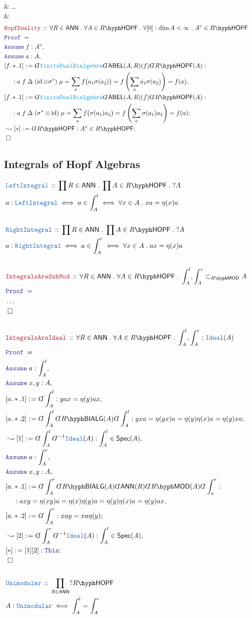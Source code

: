 \documentclass[12pt]{scrartcl}%
\newcommand{\TYPE}[1]{\textcolor{NavyBlue}{\mathtt{#1}}}%
\newcommand{\FUNC}[1]{\textcolor{Cerulean}{\mathtt{#1}}}%
\newcommand{\LOGIC}[1]{\textcolor{Blue}{\mathtt{#1}}}%
\newcommand{\THM}[1]{\textcolor{Maroon}{\mathtt{#1}}}%
\renewcommand{\.}{\; . \;} %
\newcommand{\de}{: \kern 0.1pc =} %
\newcommand{\Theorem}[2]{& \THM{#1} \, :: \, #2 \\ & \Proof = \\ } %
\newcommand{\DeclareType}[2]{& \TYPE{#1} \, :: \, #2 \\}%
\newcommand{\DefineType}[3]{& #1 : \TYPE{#2} \iff #3 \\}%
\newcommand{\DefineNamedType}[4]{& #1 : \TYPE{#2} \iff #3 \iff #4 \\}%
\newcommand{\NewLine}{\\ & \kern 1pc}%
\newcommand{\Page}[1]{ \begin{align*} #1 \end{align*}  }%
\newcommand{ \bd }{ \ByDef }%
\newcommand{\NoProof}{ & \ldots \\ \EndProof}%
\DeclareMathOperator*{\id}{id}%
\newcommand{\Say}[3]{& #1 \de #2 : #3, \\} %
\newcommand{\Conclude}[3]{& #1 \de #2 : #3; \\}%
\newcommand{\Derive}[3]{& \leadsto #1 \de #2 : #3, \\} %
\newcommand{\DeriveConclude}[3]{& \leadsto #1 \de #2 : #3 ; \\} %
\newcommand{\Assume}[2]{& \LOGIC{Assume} \; #1 : #2, \\} %
\newcommand{\QED}{\; \square} %
\newcommand{\EndProof}{& \QED \\} %
\newcommand{\ByDef}{\rotatebox[origin=c]{-180}{$D$}}%
\newcommand{\Proof}{\LOGIC{Proof} \; } %
\newcommand{\ABEL}{\mathsf{ABEL}} %
\newcommand{\submod}[1]{\subset_{\LMOD{#1}}}%
\newcommand{\LMOD}[1]{#1\hyph\mathsf{MOD}} %
\newcommand{\Ideal}{\TYPE{Ideal}}
\newcommand{\ANN}{\mathsf{ANN}} %
\newcommand{\BIALG}[1]{#1\hyph\mathsf{BIALG}}%
\newcommand{\HOPF}[1]{#1\hyph\mathsf{HOPF}}%
\begin{document}
{{	}
	\NoProof
}\Page{
	\Theorem{HopfDuality}{  
		\forall R \in \ANN \.
		\forall A \in \HOPF{R} \.
		\forall [0] : \dim A < \infty \.
		A^\circ \in \HOPF{R}
	}
	\Assume{f}{A^\circ}
	\Assume{a}{A}
	\Say{[f.*.1]}
	{
		\bd \FUNC{finiteDualBialgebra}
		\bd \ABEL(A,R)(f)
		\bd \HOPF{R}(A)
	}
	{
		\NewLine :
		a \; f \; \Delta \; (\id \otimes \sigma^*) \; \mu  =
		\sum_a f\big( a_1 \sigma(a_2)  \big)   =
		f \left( \sum_a a_1 \sigma(a_2) \right)  =
		f(a)
	}
	\Conclude{[f.*.1]}
	{
		\bd \FUNC{finiteDualBialgebra}
		\bd \ABEL(A,R)(f)
		\bd \HOPF{R}(A)
	}
	{
		\NewLine :
		a  \;  f \; \Delta \; (\sigma^* \otimes \id) \; \mu  =
		\sum_a f\big( \sigma(a_1) a_2  \big)   =
		f \left( \sum_a \sigma(a_1) a_2 \right)  =
		f(a)
	}
	\DeriveConclude{[*]}{\bd \HOPF{R}}{A^\circ \in \HOPF{R}}
	\EndProof
}
\newpage
\subsection{Integrals of Hopf Algebras}
\Page{
	\DeclareType{LeftIntegral}{\prod R \in \ANN \. \prod A \in \HOPF{R} \. ?A}
	\DefineNamedType{a}{LeftIntegral}{a \in \int_A^l }{\forall x \in A \. xa = \eta(x)a}
	\\
	\DeclareType{RightIntegral}{\prod R \in \ANN \. \prod A \in \HOPF{R} \. ?A}
	\DefineNamedType{a}{RightIntegral}{a \in \int_A^r }{\forall x \in A \. ax = \eta(x)a}
	\\
	\Theorem{IntegralsAreSubMod}{
		\forall R \in \ANN \. 
		\forall A \in \HOPF{R} \. 
		\int^l_A, \int^r_A \submod{R} A
	}
	\NoProof
	\\
	\Theorem{IntegralsAreIdeal}
	{
		\forall R \in \ANN \.
		\forall A \in \HOPF{R} \.
		\int^l_A,\int^r_A : \Ideal(A)
	}
	\Assume{a}{\int^l_A}
	\Assume{x,y}{A}
	\Say{[a.*.1]}{\bd \int^l_A}
	{ 
		yax = \eta(y)ax
	}
	\Conclude{[a.*.2]}{\bd \int^l_A \bd \BIALG{R}(A) \bd \int^l_A}
	{
		yxa = \eta(yx)a = \eta(y)\eta(x)a = \eta(y)xa
	}
	\Derive{[1]}{\bd \int^l_A \bd^{-1} \Ideal(A)}{ \int^l_A \in \mathsf{Spec}(A)  }
	\Assume{a}{\int^r_A}
	\Assume{x,y}{A}
	\Say{[a.*.1]}{\bd \int^r_A \bd \BIALG{R}(A)\bd \ANN(R) \bd \LMOD{R}(A) \bd \int^r_a }
	{ 
		\NewLine :
		axy = 
		\eta(xy)a = 
		\eta(x)\eta(y)a = 
		\eta(y)\eta(x)a =
		\eta(y)ax
	}
	\Conclude{[a.*.2]}{\bd \int^r_A }
	{
		xay = xa \eta(y)
	}
	\Derive{[2]}{\bd \int^r_A \bd^{-1} \Ideal(A)}{ \int^l_A \in \mathsf{Spec}(A)  }
	\Conclude{[*]}{[1][2]}{\LOGIC{This}}
	\EndProof
	\\
	\DeclareType{Unimodular}{\prod_{R \in \ANN} ?\HOPF{R}}
	\DefineType{A}{Unimodular}{\int^l_A = \int^r_A}
}
\end{document}
